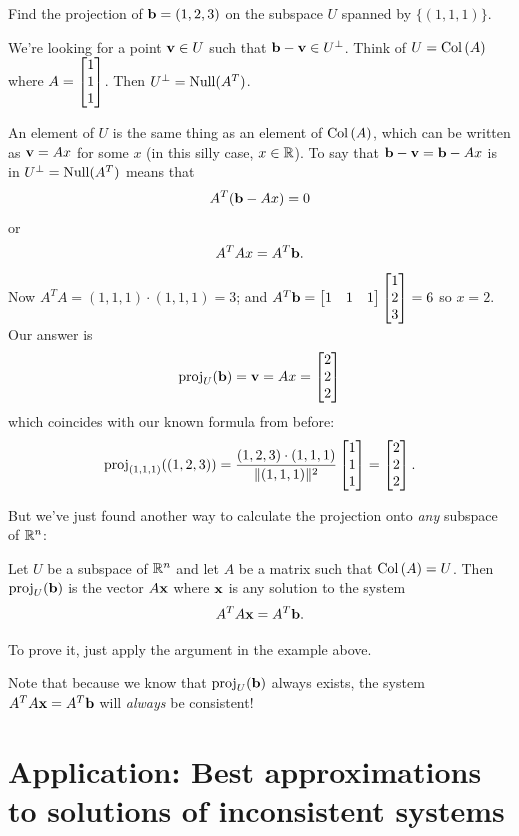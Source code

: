\bigskip
\begin{myprob}
Find the projection of $\mathbf{b} = (1,2,3)$ on the subspace $U$
spanned by $\{ (1,1,1)\}$.

\medskip

\begin{mysol}
We're looking for a point $\mathbf{v} \in U$ such that $\mathbf{b}-\mathbf{v} \in U^\perp$.
Think of $U = \operatorname{Col\,}(A)$ where $A = \left[ \begin{matrix} 1\\1\\1 \end{matrix} \right]$.
Then $U^\perp = \operatorname{Null}(A^T)$.  

An element of $U$ is the same thing as an element of $\operatorname{Col\,}(A)$, which can
be written as $\mathbf{v}=Ax$ for some $x$ (in this silly case, $x\in\mathbb{R}$).
To say that $\mathbf{b}-\mathbf{v} = \mathbf{b}-Ax$ is in $U^\perp = \operatorname{Null}(A^T)$
means that 
$$
A^T(\mathbf{b}-Ax) = 0
$$
or
$$
A^TAx = A^T\mathbf{b}.
$$
Now $A^TA = (1,1,1)\cdot (1,1,1) = 3$; and $A^T\mathbf{b} = \left[ \begin{matrix} 1 & 1 & 1 \end{matrix} \right]\left[ \begin{matrix} 1\\2\\3 \end{matrix} \right] = 6$ so $x = 2$.  Our answer
is 
$$
\operatorname{proj}_U(\mathbf{b}) = \mathbf{v} = Ax = \left[ \begin{matrix} 2\\2\\2 \end{matrix} \right]
$$
which coincides with our known formula from before:
$$
\operatorname{proj}_{(1,1,1)}((1,2,3)) = \frac{(1,2,3)\cdot (1,1,1)}{\|(1,1,1)\|^2} \left[ \begin{matrix} 1\\1\\1 \end{matrix} \right] = \left[ \begin{matrix} 2\\2\\2 \end{matrix} \right].
$$
\end{mysol}\end{myprob}

But we've just found another way to calculate the projection onto
{\it any} subspace of $\mathbb{R}^n$:

\begin{theorem}
Let $U$ be a subspace of $\mathbb{R}^n$ and let $A$ be a matrix such that
$\operatorname{Col\,}(A) = U$.  Then $\operatorname{proj}_U(\mathbf{b})$ is the vector $A\mathbf{x}$ 
where $\mathbf{x}$ is any solution to the system
$$
A^TA \mathbf{x} = A^T \mathbf{b}.
$$
\end{theorem}

To prove it, just apply the argument in the example above.

Note that because we know that $\operatorname{proj}_U(\mathbf{b})$ always exists, the system  
$A^TA \mathbf{x} = A^T \mathbf{b}$ will {\it always} be consistent!

\section{Application: Best approximations to solutions of inconsistent systems}

